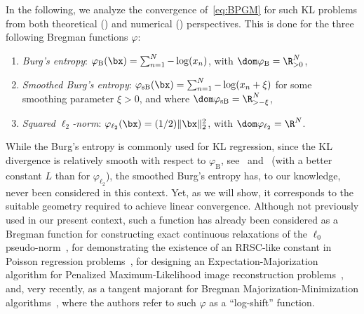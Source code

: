 \documentclass[11pt]{amsart}
\begin{document}
In the following, we analyze the convergence of~\eqref{eq:BPGM} for such KL problems from both theoretical () and numerical () perspectives. This is done for the three following Bregman functions $\varphi$:
\begin{enumerate}
\item\label{varphi is Burg} \emph{Burg's entropy}: $\varphi_\mathrm{B}(\bx)=\sum_{n=1}^N-\log(x_n)$, with $\dom\varphi_\mathrm{B}= \R_{>0}^N$,
\item\label{varphi is sBurg} \emph{Smoothed Burg's entropy}: $\varphi_{\mathrm{sB}}(\bx)=\sum_{n=1}^N -\log(x_n+\xi)$ for some smoothing parameter $\xi>0$, and where $\dom\varphi_{\mathrm{sB}}=\R_{> -\xi}^N$, %
\item\label{varphi is l2} \emph{Squared $\ell_2$-norm}: $\varphi_{\ell_2}(\bx)=(1/2)\|\bx\|_2^2$, with $\dom\varphi_{\ell_2}=\R^N$.
\end{enumerate}
While the Burg's entropy is commonly used for KL regression, since the KL divergence is relatively smooth with respect to $\varphi_\mathrm{B}$, see~\cite{bauschke2017descent} and~ (with a better constant $L$ than for $\varphi_{\ell_2}$), the smoothed Burg's entropy has, to our knowledge, never been considered in this context. Yet, as we will show, it corresponds to the suitable geometry required to achieve linear convergence. Although not previously used in our present context, such a function has already been considered as a Bregman function for constructing exact continuous relaxations of the $\ell_0$ pseudo-norm~\cite{EssafriKL,Essafri2024}, for demonstrating the existence of an RRSC-like constant in Poisson regression problems~\cite{chirinos2025}, for designing an Expectation-Majorization algorithm for Penalized Maximum-Likelihood image reconstruction problems~\cite{FessHe1995}, and, very recently, as a tangent majorant for Bregman Majorization-Minimization algorithms~\cite{adly2026}, where the authors refer to such $\varphi$ as a ``log-shift'' function.
\end{document}

